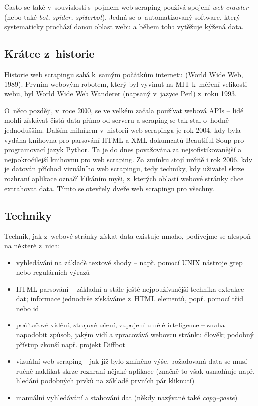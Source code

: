 \documentclass[thesis=B,czech]{FITthesis}[2012/06/26]
\begin{document}
Často se také v~souvislosti s~pojmem web scraping používá spojení \emph{web crawler} (nebo také \emph{bot, spider, spiderbot}). Jedná se o~automatizovaný software, který systematicky prochází danou oblast webu a během toho vytěžuje kýžená data.\cite{web_crawler_def}

\subsection{Krátce z~historie}
Historie web scrapingu sahá k~samým počátkům internetu (World Wide Web, 1989). Prvním webovým robotem, který byl vyvinut na MIT k~měření velikosti webu, byl World Wide Web Wanderer (napsaný v~jazyce Perl) z~roku 1993.\cite{web_wanderer}

O~něco později, v~roce 2000, se ve velkém začala používat webová APIs -- lidé mohli získávat čistá data přímo od serveru a scraping se tak stal o~hodně jednodušším. Dalším milníkem v~historii web scrapingu je rok 2004, kdy byla vydána knihovna pro parsování HTML a XML dokumentů Beautiful Soup pro programovací jazyk Python. Ta je do dnes považována za nejsofistikovanější a nejpokročilejší knihovnu pro web scraping. Za zmínku stojí určitě i rok 2006, kdy je datován příchod vizuálního web scrapingu, tedy techniky, kdy uživatel skrze rozhraní aplikace označí klikáním myši, z~kterých oblastí webové stránky chce extrahovat data. Tímto se otevřely dveře web scrapingu pro všechny.\cite{web_scraping_history}

\subsection{Techniky}
Technik, jak z~webové stránky získat data existuje mnoho, podívejme se alespoň na některé z~nich:
\begin{itemize}
	\item vyhledávání na základě textové shody -- např. pomocí UNIX nástroje grep nebo regulárních výrazů
	\item HTML parsování -- základní a stále ještě nejpoužívanější technika extrakce dat; informace jednoduše získáváme z~HTML elementů, popř. pomocí tříd nebo id
	\item počítačové vidění, strojové učení, zapojení umělé inteligence -- snaha napodobit způsob, jakým vidí a zpracovává webovou stránku člověk; podobný přístup zkouší např. projekt Diffbot \cite{computer_vision}
	\item vizuální web scraping -- jak již bylo zmíněno výše, požadovaná data se musí ručně naklikat skrze rozhraní nějaké aplikace (značně to však usnadňuje např. hledání podobných prvků na základě prvních pár kliknutí)
	\item manuální vyhledávání a stahování dat (někdy nazývané také \emph{copy--paste})
\end{itemize}
\end{document}
